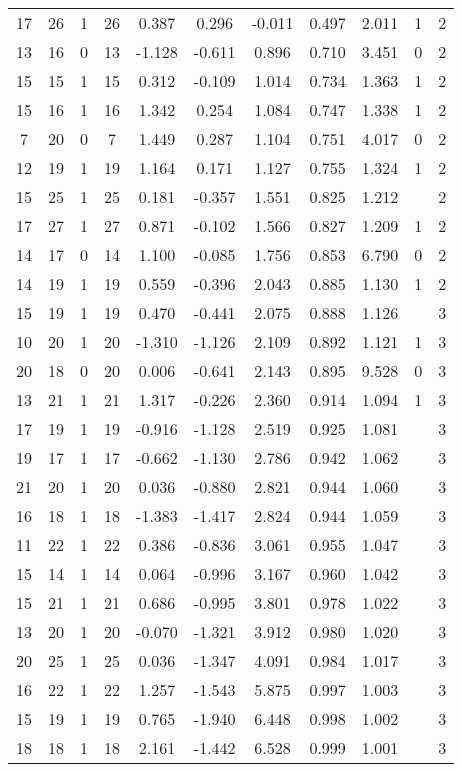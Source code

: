 \begin{longtable}{c c c c c c c c c c c }
17&26&1&26&0.387&0.296&-0.011&0.497&2.011&1&2\\
13&16&0&13&-1.128&-0.611&0.896&0.710&3.451&0&2\\
15&15&1&15&0.312&-0.109&1.014&0.734&1.363&1&2\\
15&16&1&16&1.342&0.254&1.084&0.747&1.338&1&2\\
7&20&0&7&1.449&0.287&1.104&0.751&4.017&0&2\\
12&19&1&19&1.164&0.171&1.127&0.755&1.324&1&2\\
15&25&1&25&0.181&-0.357&1.551&0.825&1.212&&2\\
17&27&1&27&0.871&-0.102&1.566&0.827&1.209&1&2\\
14&17&0&14&1.100&-0.085&1.756&0.853&6.790&0&2\\
14&19&1&19&0.559&-0.396&2.043&0.885&1.130&1&2\\
15&19&1&19&0.470&-0.441&2.075&0.888&1.126&&3\\
10&20&1&20&-1.310&-1.126&2.109&0.892&1.121&1&3\\
20&18&0&20&0.006&-0.641&2.143&0.895&9.528&0&3\\
13&21&1&21&1.317&-0.226&2.360&0.914&1.094&1&3\\
17&19&1&19&-0.916&-1.128&2.519&0.925&1.081&&3\\
19&17&1&17&-0.662&-1.130&2.786&0.942&1.062&&3\\
21&20&1&20&0.036&-0.880&2.821&0.944&1.060&&3\\
16&18&1&18&-1.383&-1.417&2.824&0.944&1.059&&3\\
11&22&1&22&0.386&-0.836&3.061&0.955&1.047&&3\\
15&14&1&14&0.064&-0.996&3.167&0.960&1.042&&3\\
15&21&1&21&0.686&-0.995&3.801&0.978&1.022&&3\\
13&20&1&20&-0.070&-1.321&3.912&0.980&1.020&&3\\
20&25&1&25&0.036&-1.347&4.091&0.984&1.017&&3\\
16&22&1&22&1.257&-1.543&5.875&0.997&1.003&&3\\
15&19&1&19&0.765&-1.940&6.448&0.998&1.002&&3\\
18&18&1&18&2.161&-1.442&6.528&0.999&1.001&&3\\
\hline
\end{longtable}
